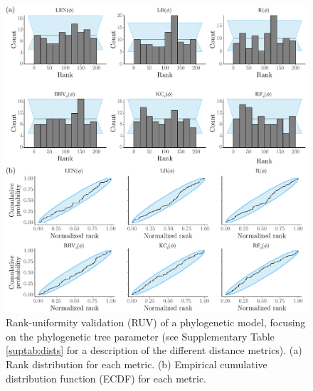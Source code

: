 \documentclass[oneside]{article}
\begin{document}
\begin{figure}
  \centering
  \includegraphics[width=\linewidth]{../figures/ruv_coalescent_manual.pdf}
   \caption{Rank-uniformity validation (RUV) of a phylogenetic model, focusing on the phylogenetic tree parameter (see Supplementary Table \ref{suptab:dists} for a description of the different distance metrics).
     (a) Rank distribution for each metric.
     (b) Empirical cumulative distribution function (ECDF) for each metric.
   }
   \label{supfig:ruv}
\end{figure}

\end{document}

